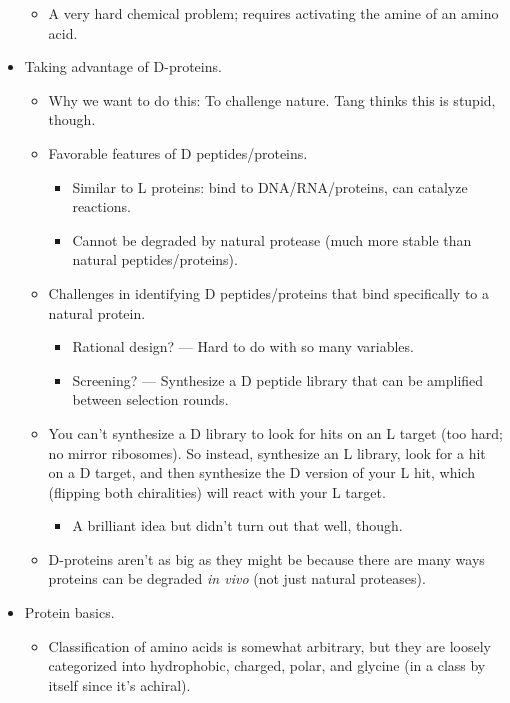 \documentclass[../notes.tex]{subfiles}
\begin{document}
\begin{itemize}
    \begin{itemize}
        \item A very hard chemical problem; requires activating the amine of an amino acid.
    \end{itemize}
    \item Taking advantage of D-proteins.
    \begin{itemize}
        \item Why we want to do this: To challenge nature. Tang thinks this is stupid, though.
        \item Favorable features of D peptides/proteins.
        \begin{itemize}
            \item Similar to L proteins: bind to DNA/RNA/proteins, can catalyze reactions.
            \item Cannot be degraded by natural protease (much more stable than natural peptides/proteins).
        \end{itemize}
        \item Challenges in identifying D peptides/proteins that bind specifically to a natural protein.
        \begin{itemize}
            \item Rational design? --- Hard to do with so many variables.
            \item Screening? --- Synthesize a D peptide library that can be amplified between selection rounds.
        \end{itemize}
        \item You can't synthesize a D library to look for hits on an L target (too hard; no mirror ribosomes). So instead, synthesize an L library, look for a hit on a D target, and then synthesize the D version of your L hit, which (flipping both chiralities) will react with your L target.
        \begin{itemize}
            \item A brilliant idea but didn't turn out that well, though.
        \end{itemize}
        \item D-proteins aren't as big as they might be because there are many ways proteins can be degraded \emph{in vivo} (not just natural proteases).
    \end{itemize}
    \item Protein basics.
    \begin{itemize}
        \item Classification of amino acids is somewhat arbitrary, but they are loosely categorized into hydrophobic, charged, polar, and glycine (in a class by itself since it's achiral).

\end{itemize}
\end{itemize}
\end{document}
